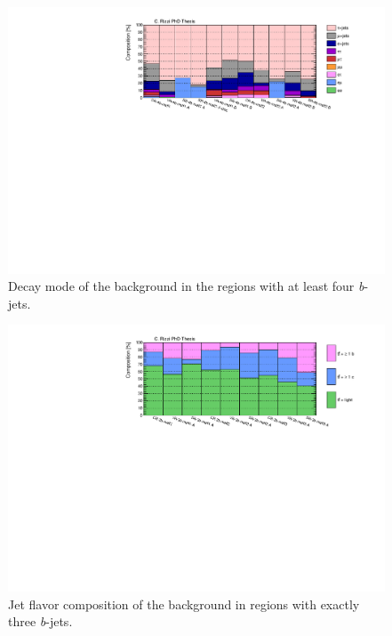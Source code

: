 \begin{figure}[htbp]
\includegraphics[width=\textwidth]{figures/ewk_prod/comp_plots/hh_4b_tt.pdf}
\caption{Decay mode of the \ttbar background in the regions with at least four \textit{b}-jets.}
	\label{fig:ttcomp_hh4b}
\end{figure}

\begin{figure}[htbp]
\includegraphics[width=\textwidth]{figures/ewk_prod/comp_plots/hh_3b_HF.pdf}
\caption{Jet flavor composition of the \ttbar background in regions with exactly three \textit{b}-jets.}
	\label{fig:HFcomp_hh3b}
\end{figure}

